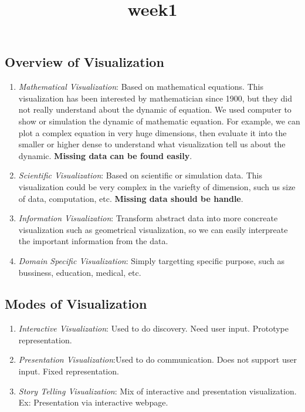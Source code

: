 \documentclass[11pt]{article}
\title{week1}
\providecommand{\tightlist}{%
      \setlength{\itemsep}{0pt}\setlength{\parskip}{0pt}}
\begin{document}
    
    
    \maketitle
    
    

    
    \subsection{Overview of Visualization}\label{overview-of-visualization}

\begin{enumerate}
\def\labelenumi{\arabic{enumi}.}
\tightlist
\item
  \emph{Mathematical Visualization}: Based on mathematical equations.
  This visualization has been interested by mathematician since 1900,
  but they did not really understand about the dynamic of equation. We
  used computer to show or simulation the dynamic of mathematic
  equation. For example, we can plot a complex equation in very huge
  dimensions, then evaluate it into the smaller or higher dense to
  understand what visualization tell us about the dynamic.
  \textbf{Missing data can be found easily}.
\item
  \emph{Scientific Visualization}: Based on scientific or simulation
  data. This visualization could be very complex in the variefty of
  dimension, such us size of data, computation, etc. \textbf{Missing
  data should be handle}.
\item
  \emph{Information Visualization}: Transform abstract data into more
  concreate visualization such as geometrical visualization, so we can
  easily interpreate the important information from the data.
\item
  \emph{Domain Specific Visualization}: Simply targetting specific
  purpose, such as bussiness, education, medical, etc.
\end{enumerate}

    \subsection{Modes of Visualization}\label{modes-of-visualization}

\begin{enumerate}
\def\labelenumi{\arabic{enumi}.}
\tightlist
\item
  \emph{Interactive Visualization}: Used to do discovery. Need user
  input. Prototype representation.
\item
  \emph{Presentation Visualization}:Used to do communication. Does not
  support user input. Fixed representation.
\item
  \emph{Story Telling Visualization}: Mix of interactive and
  presentation visualization. Ex: Presentation via interactive webpage.
\end{enumerate}
\end{document}
